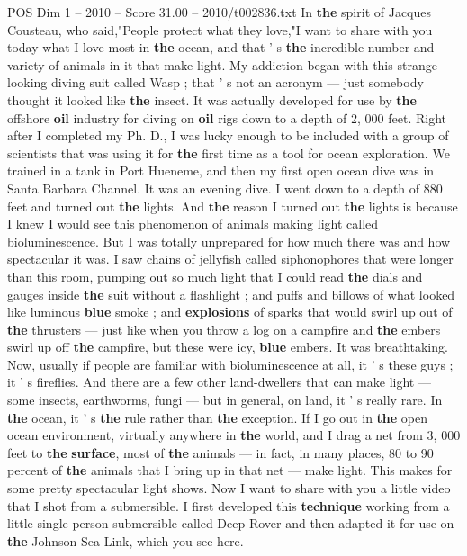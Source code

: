 \begin{textsample}{POS Dim 1 – 2010 – Score 31.00 – 2010/t002836.txt}  \label{ex:f1_pos_026}
In \textbf{the} spirit of Jacques Cousteau, who said,"People protect what they love,"I want to share with you today what I love most in \textbf{the} ocean, and that ' s \textbf{the} incredible number and variety of animals in it that make light.
My addiction began with this strange looking diving suit called Wasp ; that ' s not an acronym — just somebody thought it looked like \textbf{the} insect.
It was actually developed for use by \textbf{the} offshore \textbf{oil} industry for diving on \textbf{oil} rigs down to a depth of 2, 000 feet.
Right after I completed my Ph.
D., I was lucky enough to be included with a group of scientists that was using it for \textbf{the} first time as a tool for ocean exploration.
We trained in a tank in Port Hueneme, and then my first open ocean dive was in Santa Barbara Channel.
It was an evening dive.
I went down to a depth of 880 feet and turned out \textbf{the} lights.
And \textbf{the} reason I turned out \textbf{the} lights is because I knew I would see this phenomenon of animals making light called bioluminescence.
But I was totally unprepared for how much there was and how spectacular it was.
I saw chains of jellyfish called siphonophores that were longer than this room, pumping out so much light that I could read \textbf{the} dials and gauges inside \textbf{the} suit without a flashlight ; and puffs and billows of what looked like luminous \textbf{blue} smoke ; and \textbf{explosions} of sparks that would swirl up out of \textbf{the} thrusters — just like when you throw a log on a campfire and \textbf{the} embers swirl up off \textbf{the} campfire, but these were icy, \textbf{blue} embers.
It was breathtaking.
Now, usually if people are familiar with bioluminescence at all, it ' s these guys ; it ' s fireflies.
And there are a few other land-dwellers that can make light — some insects, earthworms, fungi — but in general, on land, it ' s really rare.
In \textbf{the} ocean, it ' s \textbf{the} rule rather than \textbf{the} exception.
If I go out in \textbf{the} open ocean environment, virtually anywhere in \textbf{the} world, and I drag a net from 3, 000 feet to \textbf{the} \textbf{surface}, most of \textbf{the} animals — in fact, in many places, 80 to 90 percent of \textbf{the} animals that I bring up in that net — make light.
This makes for some pretty spectacular light shows.
Now I want to share with you a little video that I shot from a submersible.
I first developed this \textbf{technique} working from a little single-person submersible called Deep Rover and then adapted it for use on \textbf{the} Johnson Sea-Link, which you see here.

\end{textsample}

